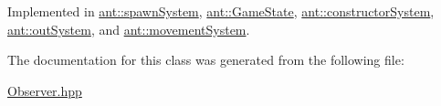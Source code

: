 Implemented in \hyperlink{classant_1_1spawn_system_a3950f006745c8beba1c579e2ea88b8d1}{ant\+::spawn\+System}, \hyperlink{classant_1_1_game_state_a90274b8fa005424e2d42fd526331f763}{ant\+::\+Game\+State}, \hyperlink{classant_1_1constructor_system_aefb0ab92dfd17a7a374660f77434fe3a}{ant\+::constructor\+System}, \hyperlink{classant_1_1out_system_aecb7dfd3738e303f975d28ca03165c4d}{ant\+::out\+System}, and \hyperlink{classant_1_1movement_system_ab950deb32094a7c4e2ee2663c72b7ed7}{ant\+::movement\+System}.



The documentation for this class was generated from the following file\+:\begin{DoxyCompactItemize}
\item 
\hyperlink{_observer_8hpp}{Observer.\+hpp}\end{DoxyCompactItemize}
